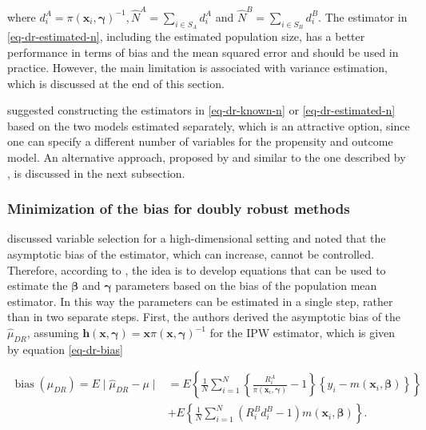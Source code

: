 \documentclass[
]{jss}
\begin{document}
where
\(d_i^A=\pi\left(\boldsymbol{x}_i, \boldsymbol{\gamma}\right)^{-1}, \hat{N}^A=\sum_{i \in S_A} d_i^A\)
and \(\hat{N}^B=\sum_{i \in S_B} d_i^B\). The estimator in
\eqref{eq-dr-estimated-n}, including the estimated population size, has
a better performance in terms of bias and the mean squared error and
should be used in practice. However, the main limitation is associated
with variance estimation, which is discussed at the end of this section.

\citet{chen2020doubly} suggested constructing the estimators in
\eqref{eq-dr-known-n} or \eqref{eq-dr-estimated-n} based on the two
models estimated separately, which is an attractive option, since one
can specify a different number of variables for the propensity and
outcome model. An alternative approach, proposed by
\citet{yang_doubly_2020} and similar to the one described by
\citet{kim2014doubly}, is discussed in the next subsection.

\subsubsection{Minimization of the bias for doubly robust
methods}\label{minimization-of-the-bias-for-doubly-robust-methods}

\citet{yang_doubly_2020} discussed variable selection for a
high-dimensional setting and noted that the asymptotic bias of the
estimator, which can increase, cannot be controlled. Therefore,
according to \citet{yang_doubly_2020}, the idea is to develop equations
that can be used to estimate the \(\boldsymbol{\beta}\) and
\(\boldsymbol{\gamma}\) parameters based on the bias of the population
mean estimator. In this way the parameters can be estimated in a single
step, rather than in two separate steps. First, the authors derived the
asymptotic bias of the \(\hat{\mu}_{DR}\), assuming
\(\boldsymbol{h}(\boldsymbol{x}, \boldsymbol{\gamma})=\boldsymbol{x}\pi(\boldsymbol{x}, \boldsymbol{\gamma})^{-1}\)
for the IPW estimator, which is given by equation \eqref{eq-dr-bias}

\begin{equation}
\begin{aligned}
\operatorname{bias}\left(\hat{\mu}_{D R}\right) = E\mid\hat{\mu}_{DR}-\mu\mid &=
E\left\{\frac{1}{N} \sum_{i=1}^N\left\{\frac{R_i^A}{\pi\left(\boldsymbol{x}_i, \boldsymbol{\gamma}\right)} - 1\right\}\left\{y_i-m\left(\boldsymbol{x}_i, \boldsymbol{\beta}\right)\right\} \right\}\\
& + E\left\{\frac{1}{N} \sum_{i=1}^N\left(R_i^B d_i^B-1\right) m\left(\boldsymbol{x}_i, \boldsymbol{\beta}\right)\right\}.
\end{aligned}
\label{eq-dr-bias}
\end{equation}
\end{document}
